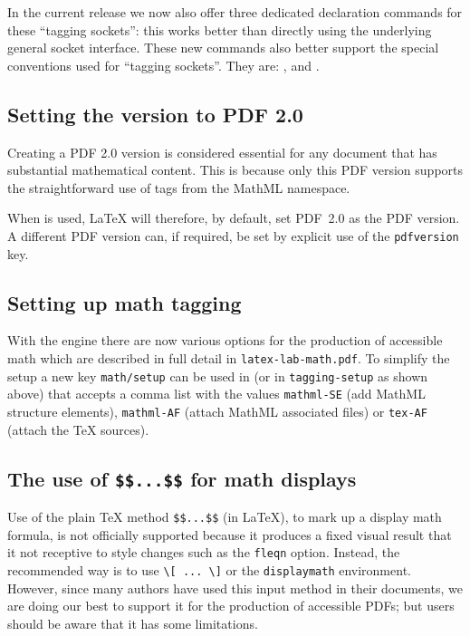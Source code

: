 \documentclass{ltnews}
\providecommand\env[1]{\texttt{#1}}
\providecommand\LuaTeX{\hologo{LuaTeX}}
\providecommand\env[1]{\texttt{#1}}
\begin{document}
In the current release we now also offer three dedicated declaration
commands for these \enquote{tagging sockets}: this works better than 
directly using the underlying general socket interface. 
These new commands also better support the
special conventions used for \enquote{tagging sockets}. They are:  
,  and
.


\subsection{Setting the version to PDF 2.0}

Creating a PDF 2.0 version is considered essential for any document that has 
substantial mathematical content.  This is because only this PDF version supports 
the straightforward use of tags from the 
MathML namespace.

When  is used, \LaTeX{}
will therefore, by default, set PDF~2.0 as the PDF version.
A different PDF version can, if required, be set by explicit use of 
the \texttt{pdfversion} key.




\subsection{Setting up math tagging}

With the \LuaTeX{} engine there are now various options for the
production of accessible math which are described in full detail in
\texttt{latex-lab-math.pdf}. To simplify the setup a new key
\texttt{math/setup} can be used in  (or in
\texttt{tagging-setup} as shown above) that accepts a comma list with
the values \texttt{mathml-SE} (add MathML structure elements),
\texttt{mathml-AF} (attach MathML associated files) or \texttt{tex-AF}
(attach the \TeX{} sources).


\subsection{The use of \texttt{\$\$...\$\$} for math displays}

Use of the plain \TeX{} method \verb=$$...$$= (in \LaTeX{}), to mark up a
display math formula, is not officially supported because it produces a
fixed visual result that it not receptive to style changes such as the
\texttt{fleqn} option. Instead, the recommended way is to use
\verb=\[ ... \]= or the \env{displaymath} environment. However, since many
authors 
have used this input method in their documents, we are doing our best to
support it for the production of accessible PDFs; but users should be
aware that it has some limitations.
\end{document}
